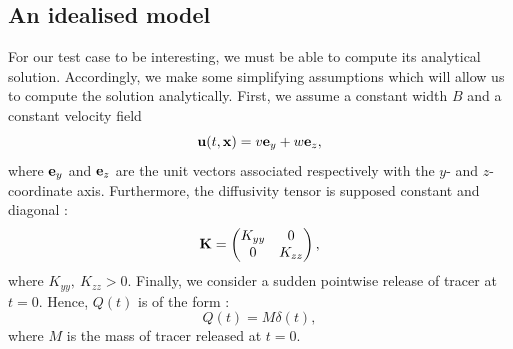\subsection{An idealised model}
For our test case to be interesting, we must be able to compute its analytical solution. Accordingly, we make some simplifying assumptions which will allow us to compute the solution analytically.
First, we assume a constant width $B$ and a constant velocity field
\begin{equation} \label{eq:testcase:velocity}
	\mathbf{u}(t,\mathbf{x}) = v \mathbf e_y + w \mathbf e_z,
\end{equation}
where $\mathbf e_y$ and $\mathbf e_z$ are the unit vectors associated respectively with the $y$- and $z$-coordinate axis. Furthermore, the diffusivity tensor is supposed constant and diagonal :
\begin{equation} \label{eq:testcase:diffusivity}
	\mathbf{K} = \begin{pmatrix}
			K_{yy} & 0 \\
			0 & K_{zz}
			\end{pmatrix},
\end{equation}
where $K_{yy},\ K_{zz} > 0$. Finally, we consider a sudden pointwise release of tracer at $t=0$. Hence, $Q(t)$ is of the form :
\begin{equation}
	Q(t) = M\delta(t),
\end{equation} 
where $M$ is the mass of tracer released at $t=0$.


